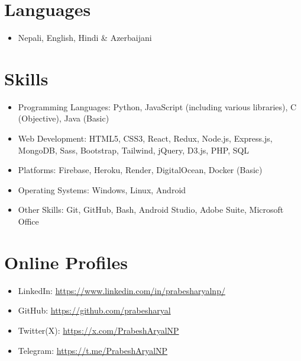 \documentclass[a4paper,10pt]{article}
\begin{document}
\begin{multicols}{2}
\section*{\textcolor{techblue}{Languages}}
\begin{itemize}
    \item Nepali, English, Hindi \& Azerbaijani
\end{itemize}

\section*{\textcolor{techblue}{Skills}}
\begin{itemize}
    \item Programming Languages: Python, JavaScript (including various libraries), C (Objective), Java (Basic)
    \item Web Development: HTML5, CSS3, React, Redux, Node.js, Express.js, MongoDB, Sass, Bootstrap, Tailwind, jQuery, D3.js, PHP, SQL
    \item Platforms:  Firebase, Heroku, Render, DigitalOcean, Docker (Basic)
    \item Operating Systems: Windows, Linux, Android
    \item Other Skills: Git, GitHub, Bash, Android Studio, Adobe Suite, Microsoft Office
\end{itemize}



\section*{\textcolor{techblue}{Online Profiles}}
\begin{itemize}
    \item LinkedIn: \textcolor{techblue}{\href{https://www.linkedin.com/in/prabesharyalnp/}{https://www.linkedin.com/in/prabesharyalnp/}}
    \item GitHub: \textcolor{techblue}{\href{https://github.com/prabesharyal}{https://github.com/prabesharyal}}
    \item Twitter(X): \textcolor{techblue}{\href{https://x.com/PrabeshAryalNP}{https://x.com/PrabeshAryalNP}}
    \item Telegram: \textcolor{techblue}{\href{https://t.me/PrabeshAryalNP}{https://t.me/PrabeshAryalNP}}

\end{itemize}

\end{multicols}
\end{document}
